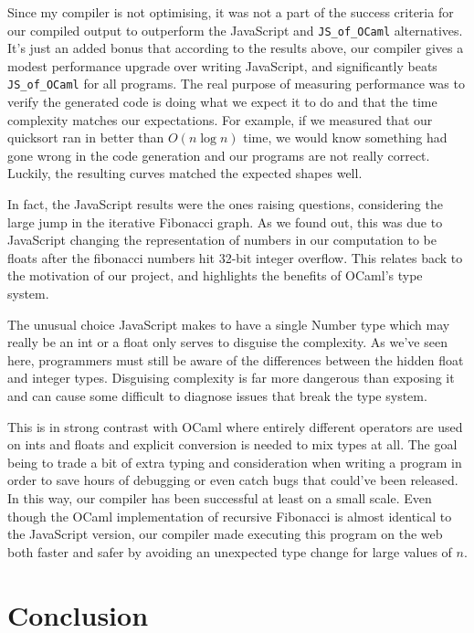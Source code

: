 \documentclass[12pt,a4paper,twoside,openright]{report}
\newcommand{\JSofOCaml}{{\tt JS\_of\_OCaml} }
\begin{document}
Since my compiler is not optimising, it was not a part of the success criteria for our compiled output to outperform the JavaScript and \JSofOCaml alternatives.
It's just an added bonus that according to the results above, our compiler gives a modest performance upgrade over writing JavaScript, and significantly beats \JSofOCaml for all programs.
The real purpose of measuring performance was to verify the generated code is doing what we expect it to do and that the time complexity matches our expectations.
For example, if we measured that our quicksort ran in better than $O(n \log n)$ time, we would know something had gone wrong in the code generation and our programs are not really correct.
Luckily, the resulting curves matched the expected shapes well.

In fact, the JavaScript results were the ones raising questions, considering the large jump in the iterative Fibonacci graph.
As we found out, this was due to JavaScript changing the representation of numbers in our computation to be floats after the fibonacci numbers hit 32-bit integer overflow.
This relates back to the motivation of our project, and highlights the benefits of OCaml's type system.

The unusual choice JavaScript makes to have a single Number type which may really be an int or a float only serves to disguise the complexity.
As we've seen here, programmers must still be aware of the differences between the hidden float and integer types.
Disguising complexity is far more dangerous than exposing it and can cause some difficult to diagnose issues that break the type system.

This is in strong contrast with OCaml where entirely different operators are used on ints and floats and explicit conversion is needed to mix types at all.
The goal being to trade a bit of extra typing and consideration when writing a program in order to save hours of debugging or even catch bugs that could've been released.
In this way, our compiler has been successful at least on a small scale.
Even though the OCaml implementation of recursive Fibonacci is almost identical to the JavaScript version, our compiler made executing this program on the web both faster and safer by avoiding an unexpected type change for large values of $n$.

\chapter{Conclusion}
\end{document}
